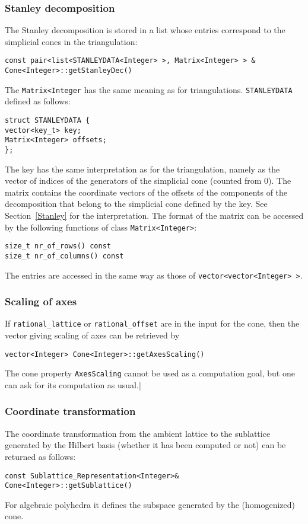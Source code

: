 \documentclass[12pt,a4paper]{scrartcl}
\theoremstyle{definition}
\begin{document}
\begin{small}
\subsubsection{Stanley decomposition}

The Stanley decomposition is stored in a list whose entries correspond to the simplicial cones in the triangulation:
\begin{Verbatim}
const pair<list<STANLEYDATA<Integer> >, Matrix<Integer> > &  Cone<Integer>::getStanleyDec()
\end{Verbatim}
The \verb|Matrix<Integer| has the same meaning as for triangulations.
\verb|STANLEYDATA| defined as follows:
\begin{Verbatim}
struct STANLEYDATA {
vector<key_t> key;
Matrix<Integer> offsets;
};
\end{Verbatim}
The key has the same interpretation as for the triangulation, namely as the vector of indices of the generators of the simplicial cone (counted from $0$). The matrix contains the coordinate vectors of the offsets of the components of the decomposition that belong to the simplicial cone defined by the key. See Section~\ref{Stanley} for the interpretation. The format of the matrix can be accessed by the following functions of class \verb|Matrix<Integer>|:
\begin{Verbatim}
size_t nr_of_rows() const
size_t nr_of_columns() const
\end{Verbatim}
The entries are accessed in the same way as those of \verb|vector<vector<Integer> >|.

\subsubsection{Scaling of axes}

If \verb|rational_lattice| or \verb|rational_offset| are in the input for the cone, then the vector giving scaling of axes can be retrieved by
\begin{Verbatim}
vector<Integer> Cone<Integer>::getAxesScaling() 
\end{Verbatim}
The cone property \verb|AxesScaling| cannot be used as a computation goal, but one can ask for its computation as usual.|

\subsubsection{Coordinate transformation}\label{coord}

The coordinate transformation from the ambient lattice to the sublattice generated by the Hilbert basis (whether it has been computed or not) can be returned as follows:
\begin{Verbatim}
const Sublattice_Representation<Integer>& Cone<Integer>::getSublattice()
\end{Verbatim}
For algebraic polyhedra it defines the subspace generated by the (homogenized) cone.


\end{small}
\end{document}
